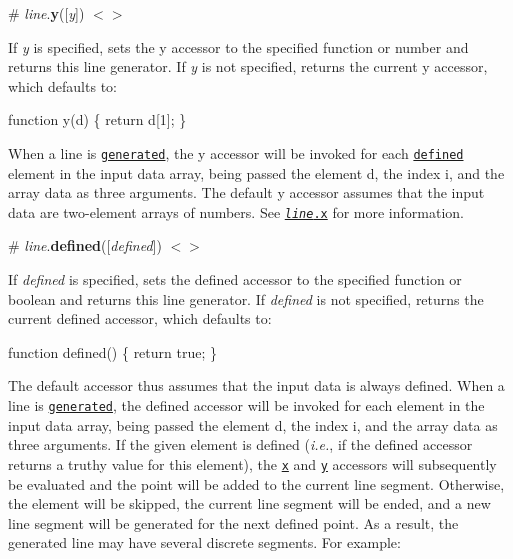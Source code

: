 \label{_line_y}%
\# {\itshape line}.{\bfseries y}(\mbox{[}{\itshape y}\mbox{]}) \href{https://github.com/d3/d3-shape/blob/master/src/line.js#L38}{\tt $<$$>$}

If {\itshape y} is specified, sets the y accessor to the specified function or number and returns this line generator. If {\itshape y} is not specified, returns the current y accessor, which defaults to\+:


\begin{DoxyCode}
function y(d) \{
  return d[1];
\}
\end{DoxyCode}


When a line is \href{#_line}{\tt generated}, the y accessor will be invoked for each \href{#line_defined}{\tt defined} element in the input data array, being passed the element {\ttfamily d}, the index {\ttfamily i}, and the array {\ttfamily data} as three arguments. The default y accessor assumes that the input data are two-\/element arrays of numbers. See \href{#line_x}{\tt {\itshape line}.x} for more information.

\label{_line_defined}%
\# {\itshape line}.{\bfseries defined}(\mbox{[}{\itshape defined}\mbox{]}) \href{https://github.com/d3/d3-shape/blob/master/src/line.js#L42}{\tt $<$$>$}

If {\itshape defined} is specified, sets the defined accessor to the specified function or boolean and returns this line generator. If {\itshape defined} is not specified, returns the current defined accessor, which defaults to\+:


\begin{DoxyCode}
function defined() \{
  return true;
\}
\end{DoxyCode}


The default accessor thus assumes that the input data is always defined. When a line is \href{#_line}{\tt generated}, the defined accessor will be invoked for each element in the input data array, being passed the element {\ttfamily d}, the index {\ttfamily i}, and the array {\ttfamily data} as three arguments. If the given element is defined ({\itshape i.\+e.}, if the defined accessor returns a truthy value for this element), the \href{#line_x}{\tt x} and \href{#line_y}{\tt y} accessors will subsequently be evaluated and the point will be added to the current line segment. Otherwise, the element will be skipped, the current line segment will be ended, and a new line segment will be generated for the next defined point. As a result, the generated line may have several discrete segments. For example\+:

